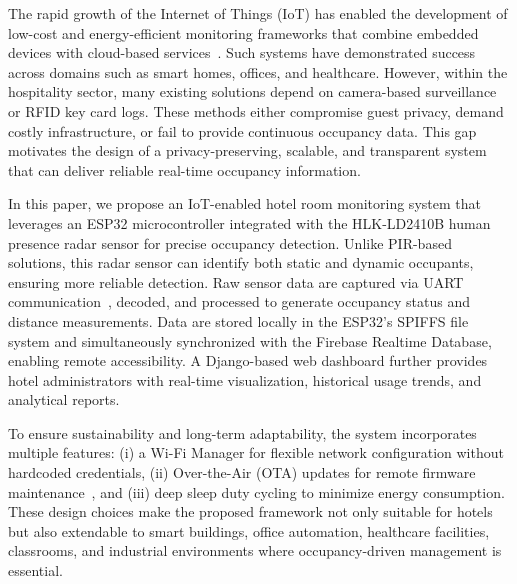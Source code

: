 \documentclass[conference]{IEEEtran}
\begin{document}
The rapid growth of the Internet of Things (IoT) has enabled the development of low-cost and energy-efficient monitoring frameworks that combine embedded devices with cloud-based services~\cite{https://doi.org/10.1155/2023/8571506}. Such systems have demonstrated success across domains such as smart homes, offices, and healthcare. However, within the hospitality sector, many existing solutions depend on camera-based surveillance or RFID key card logs. These methods either compromise guest privacy, demand costly infrastructure, or fail to provide continuous occupancy data. This gap motivates the design of a privacy-preserving, scalable, and transparent system that can deliver reliable real-time occupancy information.

In this paper, we propose an IoT-enabled hotel room monitoring system that leverages an ESP32 microcontroller integrated with the HLK-LD2410B human presence radar sensor for precise occupancy detection. Unlike PIR-based solutions, this radar sensor can identify both static and dynamic occupants, ensuring more reliable detection. Raw sensor data are captured via UART communication~\cite{10612928}, decoded, and processed to generate occupancy status and distance measurements. Data are stored locally in the ESP32’s SPIFFS file system and simultaneously synchronized with the Firebase Realtime Database, enabling remote accessibility. A Django-based web dashboard further provides hotel administrators with real-time visualization, historical usage trends, and analytical reports.

To ensure sustainability and long-term adaptability, the system incorporates multiple features: (i) a Wi-Fi Manager for flexible network configuration without hardcoded credentials, (ii) Over-the-Air (OTA) updates for remote firmware maintenance~\cite{10900824}, and (iii) deep sleep duty cycling to minimize energy consumption. These design choices make the proposed framework not only suitable for hotels but also extendable to smart buildings, office automation, healthcare facilities, classrooms, and industrial environments where occupancy-driven management is essential.
\end{document}
